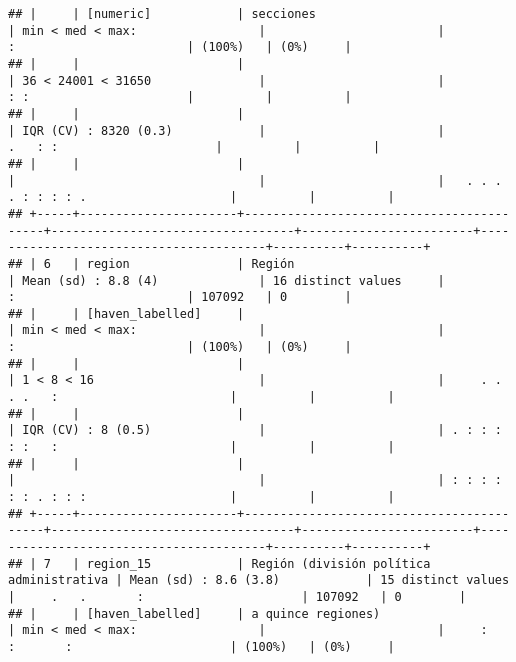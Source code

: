 \documentclass[]{article}
\begin{document}
\begin{verbatim}
## |     | [numeric]            | secciones                                | min < med < max:                 |                        |               :                        | (100%)   | (0%)     |
## |     |                      |                                          | 36 < 24001 < 31650               |                        |               : :                      |          |          |
## |     |                      |                                          | IQR (CV) : 8320 (0.3)            |                        |           .   : :                      |          |          |
## |     |                      |                                          |                                  |                        |   . . . . : : : : .                    |          |          |
## +-----+----------------------+------------------------------------------+----------------------------------+------------------------+----------------------------------------+----------+----------+
## | 6   | region               | Región                                   | Mean (sd) : 8.8 (4)              | 16 distinct values     |               :                        | 107092   | 0        |
## |     | [haven_labelled]     |                                          | min < med < max:                 |                        |               :                        | (100%)   | (0%)     |
## |     |                      |                                          | 1 < 8 < 16                       |                        |     . . . .   :                        |          |          |
## |     |                      |                                          | IQR (CV) : 8 (0.5)               |                        | . : : : : :   :                        |          |          |
## |     |                      |                                          |                                  |                        | : : : : : : . : : :                    |          |          |
## +-----+----------------------+------------------------------------------+----------------------------------+------------------------+----------------------------------------+----------+----------+
## | 7   | region_15            | Región (división política administrativa | Mean (sd) : 8.6 (3.8)            | 15 distinct values     |     .   .       :                      | 107092   | 0        |
## |     | [haven_labelled]     | a quince regiones)                       | min < med < max:                 |                        |     :   :       :                      | (100%)   | (0%)     |

\end{verbatim}
\end{document}
